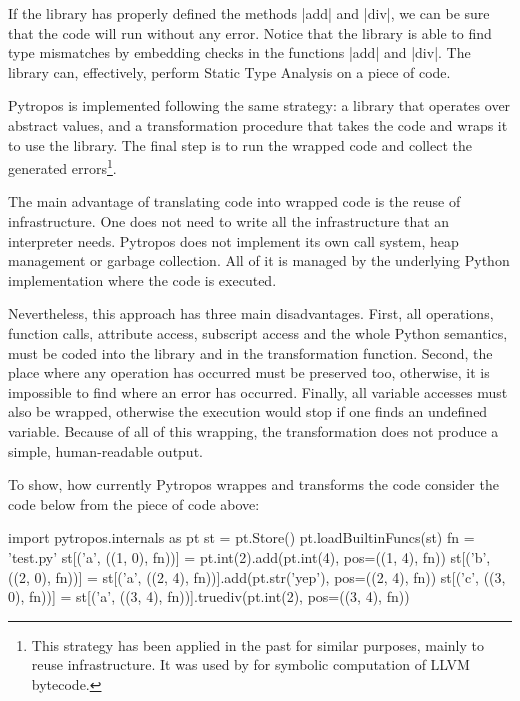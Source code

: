 If the library has properly defined the methods \pycode|add| and
\pycode|div|, we can be sure that the code will run without any error.
Notice that the library is able to find type mismatches by embedding
checks in the functions \pycode|add| and \pycode|div|. The library can,
effectively, perform Static Type Analysis on a piece of code.

Pytropos is implemented following the same strategy: a library that
operates over abstract values, and a transformation procedure that takes
the code and wraps it to use the library. The final step is to run the
wrapped code and collect the generated errors\footnote{%
  This strategy has been applied in the past for similar purposes, mainly to reuse
  infrastructure. It was used by \textcite{lauko_symbolic_2018} for symbolic computation
  of LLVM bytecode.
  }.

The main advantage of translating code into wrapped code is the reuse of
infrastructure. One does not need to write all the infrastructure that
an interpreter needs. Pytropos does not implement its own call system,
heap management or garbage collection. All of it is managed by the
underlying Python implementation where the code is executed.

Nevertheless, this approach has three main disadvantages. First, all operations, function
calls, attribute access, subscript access and the whole Python semantics, must be coded
into the library and in the transformation function. Second, the place where any operation
has occurred must be preserved too, otherwise, it is impossible to find where an error has
occurred. Finally, all variable accesses must also be wrapped, otherwise the execution
would stop if one finds an undefined variable.  Because of all of this wrapping, the
transformation does not produce a simple, human-readable output.

To show, how currently Pytropos wrappes and transforms the code consider the code below
from the piece of code above:

\begin{pythoncode}
import pytropos.internals as pt
st = pt.Store()
pt.loadBuiltinFuncs(st)
fn = 'test.py'
st[('a', ((1, 0), fn))] = pt.int(2).add(pt.int(4), pos=((1, 4), fn))
st[('b', ((2, 0), fn))] = st[('a', ((2, 4), fn))].add(pt.str('yep'), pos=((2, 4), fn))
st[('c', ((3, 0), fn))] = st[('a', ((3, 4), fn))].truediv(pt.int(2), pos=((3, 4), fn))
\end{pythoncode}

